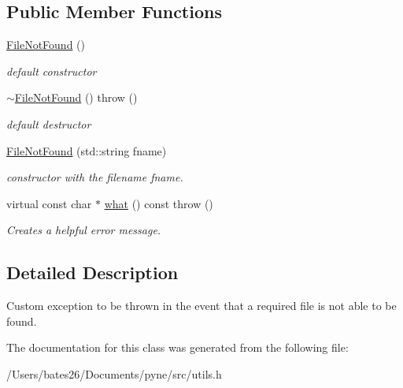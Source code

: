 \subsection*{Public Member Functions}
\begin{DoxyCompactItemize}
\item 
\hypertarget{classpyne_1_1_file_not_found_aaae1bdf04df2b68377ae453929c8eb56}{\hyperlink{classpyne_1_1_file_not_found_aaae1bdf04df2b68377ae453929c8eb56}{File\+Not\+Found} ()}\label{classpyne_1_1_file_not_found_aaae1bdf04df2b68377ae453929c8eb56}

\begin{DoxyCompactList}\small\item\em default constructor \end{DoxyCompactList}\item 
\hypertarget{classpyne_1_1_file_not_found_abc00e9c8711bb1b1bb2dc1dfd3a98745}{\hyperlink{classpyne_1_1_file_not_found_abc00e9c8711bb1b1bb2dc1dfd3a98745}{$\sim$\+File\+Not\+Found} ()  throw ()}\label{classpyne_1_1_file_not_found_abc00e9c8711bb1b1bb2dc1dfd3a98745}

\begin{DoxyCompactList}\small\item\em default destructor \end{DoxyCompactList}\item 
\hypertarget{classpyne_1_1_file_not_found_a4d766115c01634b77aebe42269f9aead}{\hyperlink{classpyne_1_1_file_not_found_a4d766115c01634b77aebe42269f9aead}{File\+Not\+Found} (std\+::string fname)}\label{classpyne_1_1_file_not_found_a4d766115c01634b77aebe42269f9aead}

\begin{DoxyCompactList}\small\item\em constructor with the filename {\itshape fname}. \end{DoxyCompactList}\item 
\hypertarget{classpyne_1_1_file_not_found_a55d410139d5853e8988d073637845cbd}{virtual const char $\ast$ \hyperlink{classpyne_1_1_file_not_found_a55d410139d5853e8988d073637845cbd}{what} () const   throw ()}\label{classpyne_1_1_file_not_found_a55d410139d5853e8988d073637845cbd}

\begin{DoxyCompactList}\small\item\em Creates a helpful error message. \end{DoxyCompactList}\end{DoxyCompactItemize}


\subsection{Detailed Description}
Custom exception to be thrown in the event that a required file is not able to be found. 

The documentation for this class was generated from the following file\+:\begin{DoxyCompactItemize}
\item 
/\+Users/bates26/\+Documents/pyne/src/utils.\+h\end{DoxyCompactItemize}
